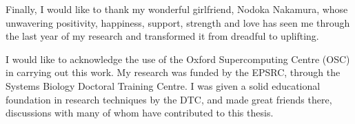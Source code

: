 Finally, I would like to thank my wonderful girlfriend, Nodoka Nakamura, whose unwavering positivity, happiness, support, strength and love has seen me through the last year of my research and transformed it from dreadful to uplifting.

I would like to acknowledge the use of the Oxford Supercomputing Centre (OSC) in carrying out this work. My research was funded by the EPSRC, through the Systems Biology Doctoral Training Centre. I was given a solid educational foundation in research techniques by the DTC, and made great friends there, discussions with many of whom have contributed to this thesis.

